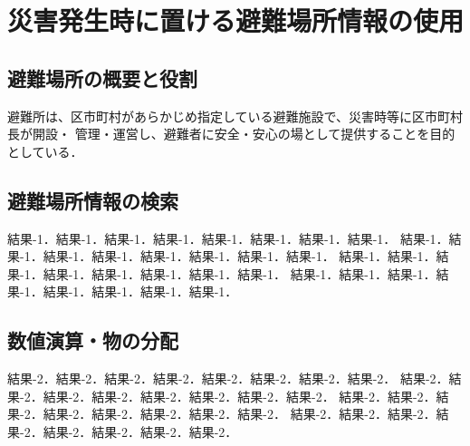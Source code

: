 ﻿%
\chapter{災害発生時に置ける避難場所情報の使用}

\section{避難場所の概要と役割}

避難所は、区市町村があらかじめ指定している避難施設で、災害時等に区市町村長が開設・
管理・運営し、避難者に安全・安心の場として提供することを目的としている．

\section{避難場所情報の検索}

結果-1．結果-1．結果-1．結果-1．結果-1．結果-1．結果-1．結果-1．
結果-1．結果-1．結果-1．結果-1．結果-1．結果-1．結果-1．結果-1．
結果-1．結果-1．結果-1．結果-1．結果-1．結果-1．結果-1．結果-1．
結果-1．結果-1．結果-1．結果-1．結果-1．結果-1．結果-1．結果-1．

\section{数値演算・物の分配}

結果-2．結果-2．結果-2．結果-2．結果-2．結果-2．結果-2．結果-2．
結果-2．結果-2．結果-2．結果-2．結果-2．結果-2．結果-2．結果-2．
結果-2．結果-2．結果-2．結果-2．結果-2．結果-2．結果-2．結果-2．
結果-2．結果-2．結果-2．結果-2．結果-2．結果-2．結果-2．結果-2．


